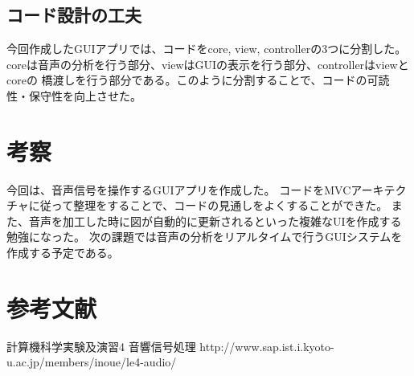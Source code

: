 \documentclass[a4paper,11pt]{jsarticle}
\begin{document}
\subsection{コード設計の工夫}
今回作成したGUIアプリでは、コードをcore, view, controllerの3つに分割した。
coreは音声の分析を行う部分、viewはGUIの表示を行う部分、controllerはviewとcoreの
橋渡しを行う部分である。このように分割することで、コードの可読性・保守性を向上させた。

\section{考察}
今回は、音声信号を操作するGUIアプリを作成した。
コードをMVCアーキテクチャに従って整理をすることで、コードの見通しをよくすることができた。
また、音声を加工した時に図が自動的に更新されるといった複雑なUIを作成する勉強になった。
次の課題では音声の分析をリアルタイムで行うGUIシステムを作成する予定である。


\section{参考文献}
計算機科学実験及演習4 音響信号処理\newline
http://www.sap.ist.i.kyoto-u.ac.jp/members/inoue/le4-audio/
\end{document}
